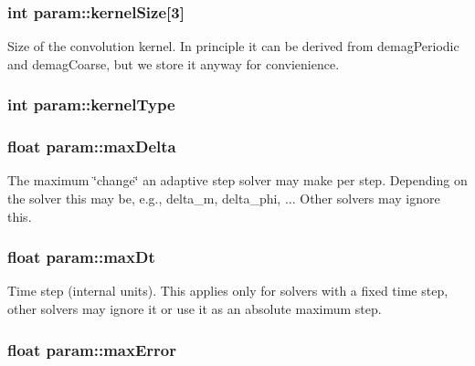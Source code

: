 \hypertarget{structparam_ab4fe619208b39b35428e7de8c688ebd3}{
\subsubsection[{kernelSize}]{\setlength{\rightskip}{0pt plus 5cm}int {\bf param::kernelSize}\mbox{[}3\mbox{]}}}
\label{structparam_ab4fe619208b39b35428e7de8c688ebd3}
Size of the convolution kernel. In principle it can be derived from demagPeriodic and demagCoarse, but we store it anyway for convienience. \hypertarget{structparam_affac74c265217e342f33965a98117c32}{
\subsubsection[{kernelType}]{\setlength{\rightskip}{0pt plus 5cm}int {\bf param::kernelType}}}
\label{structparam_affac74c265217e342f33965a98117c32}
\hypertarget{structparam_a4f60625c00da893f8501e8d449e9c92c}{
\subsubsection[{maxDelta}]{\setlength{\rightskip}{0pt plus 5cm}float {\bf param::maxDelta}}}
\label{structparam_a4f60625c00da893f8501e8d449e9c92c}


The maximum \char`\"{}change\char`\"{} an adaptive step solver may make per step. Depending on the solver this may be, e.g., delta\_\-m, delta\_\-phi, ... Other solvers may ignore this. 

\hypertarget{structparam_a559b1aeda3483e4c736d422c529bd079}{
\subsubsection[{maxDt}]{\setlength{\rightskip}{0pt plus 5cm}float {\bf param::maxDt}}}
\label{structparam_a559b1aeda3483e4c736d422c529bd079}


Time step (internal units). This applies only for solvers with a fixed time step, other solvers may ignore it or use it as an absolute maximum step. 

\hypertarget{structparam_a2a8499acbeddc6e61a98595844265a16}{
\subsubsection[{maxError}]{\setlength{\rightskip}{0pt plus 5cm}float {\bf param::maxError}}}
\label{structparam_a2a8499acbeddc6e61a98595844265a16}



